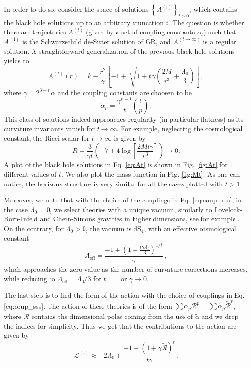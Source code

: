 \documentclass[aps,prd,preprint,nofootinbib]{revtex4-1}
\begin{document}
In order to do so, consider the space of solutions $\left\{ A^{(t)} \right\}_{t>0}$, which contains the black hole solutions up to an arbitrary truncation $t$. The question is whether there are trajectories $A^{(t)}$ (given by a set of coupling constants $\alpha_t$) such that $A^{(1)}$ is the Schwarzschild de-Sitter solution of GR, and $A^{(t \to \infty)}$ is a regular solution. A straightforward generalization of the previous black hole solutions yields to
\begin{equation}
A^{(t)}(r) = k - \frac{r^2}{\gamma} \left[ -1 +   \sqrt[t]{  1+ t\, \gamma \left( \frac{2M}{r^3}  + \frac{\Lambda_0}{3} \right) }\right]\,,\label{eq:At}
\end{equation}
where $\gamma=2^{3-t}\,\alpha$ and the coupling constants are choosen to be
\begin{equation}
    \tilde{\alpha}_p=\frac{\gamma^{p-1}}{t}\binom{t}{p}\,.\label{eq:coup_sss}
\end{equation}
This class of solutions indeed approaches regularity (in particular flatness) as its curvature invariants vanish for $t \to \infty$. For example, neglecting the cosmological constant, the Ricci scalar for $t\to \infty$ is given by 
\begin{equation}
R= \frac{3}{\gamma t} \left(-7+4\log\left[\frac{2 M t \gamma}{r^3}\right] \right) \to 0.
\end{equation}
A plot of the black hole solutions in Eq. \eqref{eq:At} is shown in Fig. \ref{fig:At} for different values of $t$. We also plot the mass function in Fig. \ref{fig:Mt}. As one can notice, the horizons structure is very similar for all the cases plotted with $t>1$.

Moreover, we note that with the choice of the couplings in Eq. \eqref{eq:coup_sss}, in the case $\Lambda_0=0$, we select theories with a unique vacuum, similarly to Lovelock-Born-Infeld and Chern-Simons gravities in higher dimensions, see for example \cite{Lovelock-Born-Infeld1,Lovelock-Born-Infeld2, Lovelock-Chern-Simons}. On the contrary, for $\Lambda_0>0$, the vacuum is dS$_4$, with an effective cosmological constant
\begin{equation}
\Lambda_{\text{eff}} = \frac{-1 + \left(1 +\frac{ t \gamma \Lambda_0}{3}\right)^{1/t}}{\gamma} \,,
\end{equation}
which approaches the zero value as the number of curvature corrections increases, while reducing to $\Lambda_{\text{eff}} = \Lambda_0 /3$ for $t=1$ or $\gamma \to 0$.

The last step is to find the form of the action with the choice of couplings in Eq. \eqref{eq:coup_sss}. The action of these theories is of the form $\sum \alpha_p \mathcal{R}^p = \sum \tilde{\alpha}_p \tilde{\mathcal{R}}^p$, where $\tilde{\mathcal{R}}$ contains the dimensional poles coming from the use of $\tilde{\alpha}$ and we drop the indices for simplicity. Thus we get that the contributions to the action are given by
\begin{equation}
\mathcal{L}^{(t)} \approx -2\Lambda_0 + \frac{-1 + \left(1 + \gamma \tilde{\mathcal{R}}\right)^t}{t \gamma}\,.
\end{equation}
\end{document}
